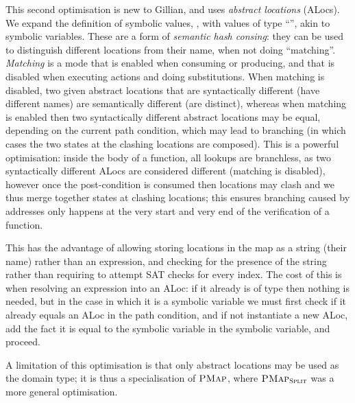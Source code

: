 This second optimisation is new to Gillian, and uses \emph{abstract locations} (ALocs). We expand the definition of symbolic values, , with values of type ``'', akin to symbolic variables. These are a form of \emph{semantic hash consing}: they can be used to distinguish different locations from their name, when not doing ``matching''. \emph{Matching} is a mode that is enabled when consuming or producing, and that is disabled when executing actions and doing substitutions. When matching is disabled, two given abstract locations that are syntactically different (have different names) are semantically different (are distinct), whereas when matching is enabled then two syntactically different abstract locations may be equal, depending on the current path condition, which may lead to branching (in which cases the two states at the clashing locations are composed). This is a powerful optimisation: inside the body of a function, all lookups are branchless, as two syntactically different ALocs are considered different (matching is disabled), however once the post-condition is consumed then locations may clash and we thus merge together states at clashing locations; this ensures branching caused by addresses only happens at the very start and very end of the verification of a function.

This has the advantage of allowing storing locations in the map as a string (their name) rather than an expression, and checking for the presence of the string rather than requiring to attempt SAT checks for every index. The cost of this is when resolving an expression into an ALoc: if it already is of type  then nothing is needed, but in the case in which it is a symbolic variable we must first check if it already equals an ALoc in the path condition, and if not instantiate a new ALoc, add the fact it is equal to the symbolic variable in the symbolic variable, and proceed.

A limitation of this optimisation is that only abstract locations may be used as the domain type; it is thus a specialisation of $\textsc{PMap}$, where $\textsc{PMap}_{\textsc{Split}}$ was a more general optimisation.

